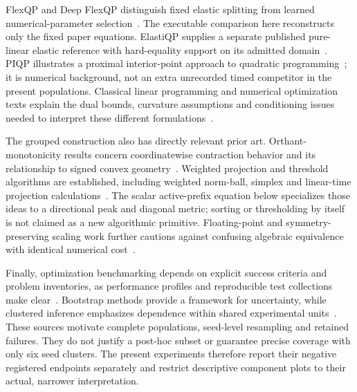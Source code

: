 FlexQP and Deep FlexQP distinguish fixed elastic splitting from learned
numerical-parameter selection~\cite{flex}. The executable comparison here
reconstructs only the fixed paper equations. ElastiQP supplies a separate
published pure-linear elastic reference with hard-equality support on its
admitted domain~\cite{elasti}. PIQP illustrates a proximal interior-point
approach to quadratic programming~\cite{piqp}; it is numerical background,
not an extra unrecorded timed competitor in the present populations.
Classical linear programming and numerical optimization texts explain the
dual bounds, curvature assumptions and conditioning issues needed to
interpret these different formulations~\cite{vanderbei,nocedal}.

The grouped construction also has directly relevant prior art. Orthant-
monotonicity results concern coordinatewise contraction behavior and its
relationship to signed convex geometry~\cite{orthant}. Weighted projection
and threshold algorithms are established, including weighted norm-ball,
simplex and linear-time projection calculations~\cite{weighted,duchi,condat}.
The scalar active-prefix equation below specializes those ideas to a
directional peak and diagonal metric; sorting or thresholding by itself
is not claimed as a new algorithmic primitive. Floating-point and symmetry-
preserving scaling work further cautions against confusing algebraic
equivalence with identical numerical cost~\cite{higham,knight}.

Finally, optimization benchmarking depends on explicit success criteria
and problem inventories, as performance profiles and reproducible test
collections make clear~\cite{dolan,cutest}. Bootstrap methods provide a
framework for uncertainty, while clustered inference emphasizes dependence
within shared experimental units~\cite{efron,davison,cameron}. These sources
motivate complete populations, seed-level resampling and retained failures.
They do not justify a post-hoc subset or guarantee precise coverage with
only six seed clusters. The present experiments therefore report their
negative registered endpoints separately and restrict descriptive component
plots to their actual, narrower interpretation.
